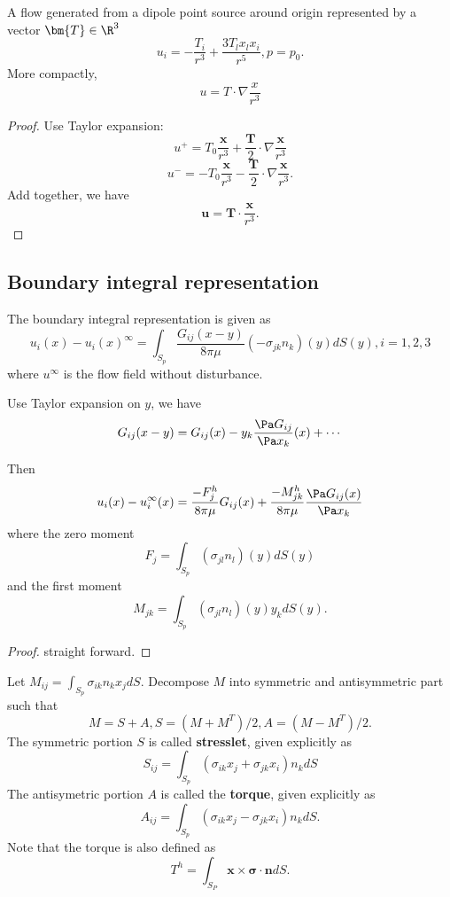 \begin{refsection}
\begin{lemma}\cite[135]{barthes2012microhydrodynamics}\hfill
	A flow generated from a dipole point source around origin represented by a vector $\bm{T}\in \R^3$
	$$u_i = -\frac{T_i}{r^3} + \frac{3T_lx_lx_i}{r^5}, p=p_0.$$
More compactly, 
$$u = T\cdot \nabla \frac{x}{r^3}$$ 
\end{lemma}
\begin{proof}
Use Taylor expansion:
$$u^+ = T_0\frac{\bm{x}}{r^3} + \frac{\bm{T}}{2}\cdot \nabla \frac{\bm{x}}{r^3}$$
$$u^- = -T_0\frac{\bm{x}}{r^3}  -\frac{\bm{T}}{2}\cdot \nabla \frac{\bm{x}}{r^3}.$$
Add together, we have
$$\bm{u} = \bm{T} \cdot \frac{\bm{x}}{r^3}.$$
\end{proof}

\subsection{Boundary integral representation}
\begin{lemma}\cite[59]{guazzelli2011physical}
The boundary integral representation is given as
	$$u_i(x) - u_i(x)^\infty = \int_{S_p} \frac{G_{ij}(x-y)}{8\pi\mu}(-\sigma_{jk}n_k)(y)dS(y),i=1,2,3$$
where $u^\infty$ is the flow field without disturbance.
\end{lemma}


\begin{lemma}
Use Taylor expansion on $y$, we have
$$G_{ij}(x-y) = G_{ij}(x) - y_k \frac{\Pa G_{ij}}{\Pa x_k}(x) + \cdots $$

Then
$$u_i(x) - u_i^\infty(x) = \frac{-F_j^h}{8\pi\mu}G_{ij}(x) +\frac{-M_{jk}^h}{8\pi\mu}\frac{\Pa G_{ij}(x)}{\Pa x_k}$$
where the zero moment
$$F_j = \int_{S_p} (\sigma_{jl}n_l)(y)dS(y)$$
and the first moment
$$M_{jk} = \int_{S_p} (\sigma_{jl}n_l)(y)y_kdS(y).$$
\end{lemma}
\begin{proof}
straight forward.
\end{proof}


\begin{definition}\cite[41,42]{guazzelli2011physical}
Let $M_{ij} = \int_{S_p} \sigma_{ik}n_k x_j dS$.
Decompose $M$ into symmetric and antisymmetric part such that
$$M = S + A, S = (M + M^T)/2, A = (M - M^T)/2.$$
The symmetric portion $S$ is called \textbf{stresslet}, given explicitly as
$$S_{ij} = \int_{S_p} (\sigma_{ik} x_j + \sigma_{jk} x_i) n_kdS$$
The antisymetric portion $A$ is called the \textbf{torque}, given explicitly as
$$A_{ij} = \int_{S_p} (\sigma_{ik} x_j - \sigma_{jk} x_i) n_kdS.$$
Note that the torque is also defined as
$$T^h = \int_{S_P} \bm{x}\times\bm{\sigma}\cdot \bm{n}dS.$$
\end{definition}


\end{refsection}
